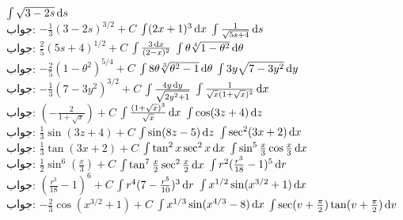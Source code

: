 $\int\sqrt{3-2s}\dif s$\\
جواب:\quad
$-\tfrac{1}{3}(3-2s)^{3/2}+C$
$\int(2x+1)^3\dif x$
$\int\tfrac{1}{\sqrt{5s+4}}\dif s$\\
جواب:\quad
$\tfrac{2}{5}(5s+4)^{1/2}+C$
$\int\tfrac{3\dif x}{(2-x)^2}$
$\int\theta\sqrt[4]{1-\theta^2}\dif \theta$\\
جواب:\quad
$-\tfrac{2}{5}(1-\theta^2)^{5/4}+C$
$\int8\theta\sqrt[3]{\theta^2-1}\dif\theta$
$\int3y\sqrt{7-3y^2}\dif y$\\
جواب:\quad
$-\tfrac{1}{3}(7-3y^2)^{3/2}+C$
$\int\tfrac{4y\dif y}{\sqrt{2y^2+1}}$
$\int\tfrac{1}{\sqrt{x}(1+\sqrt{x})^2}\dif x$\\
جواب:\quad
$(-\tfrac{2}{1+\sqrt{x}})+C$
$\int\tfrac{(1+\sqrt{x})^3}{\sqrt{x}}\dif x$
$\int\cos(3z+4)\dif z$\\
جواب:\quad
$\tfrac{1}{3}\sin(3z+4)+C$
$\int\sin(8z-5)\dif z$
$\int\sec^2(3x+2)\dif x$\\
جواب:\quad
$\tfrac{1}{3}\tan(3x+2)+C$
$\int\tan^2x\sec^2x\dif x$
$\int\sin^5\tfrac{x}{3}\cos\tfrac{x}{3}\dif x$\\
جواب:\quad
$\tfrac{1}{2}\sin^6(\tfrac{x}{3})+C$
$\int\tan^7\tfrac{x}{2}\sec^2\tfrac{x}{2}\dif x$
$\int r^2(\tfrac{r^3}{18}-1)^5\dif r$\\
جواب:\quad
$(\tfrac{r^3}{18}-1)^6+C$
$\int r^4(7-\tfrac{r^5}{10})^3\dif r$
$\int x^{1/2}\sin(x^{3/2}+1)\dif x$\\
جواب:\quad
$-\tfrac{2}{3}\cos(x^{3/2}+1)+C$
$\int x^{1/3}\sin(x^{4/3}-8)\dif x$
$\int\sec(v+\tfrac{\pi}{2})\tan(v+\tfrac{\pi}{2})\dif v$\\
